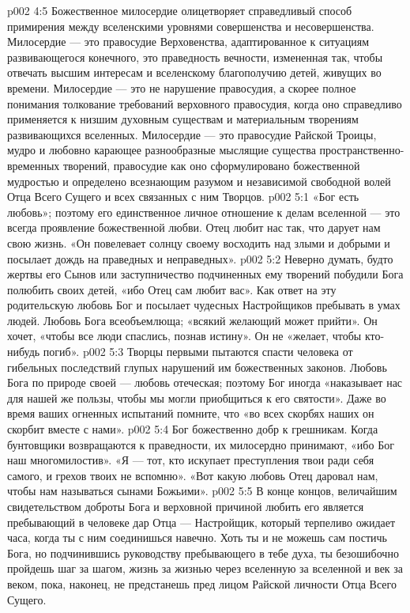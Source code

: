 \vs p002 4:5 Божественное милосердие олицетворяет справедливый способ примирения между вселенскими уровнями совершенства и несовершенства. Милосердие --- это правосудие Верховенства, адаптированное к ситуациям развивающегося конечного, это праведность вечности, измененная так, чтобы отвечать высшим интересам и вселенскому благополучию детей, живущих во времени. Милосердие --- это не нарушение правосудия, а скорее полное понимания толкование требований верховного правосудия, когда оно справедливо применяется к низшим духовным существам и материальным творениям развивающихся вселенных. Милосердие --- это правосудие Райской Троицы, мудро и любовно карающее разнообразные мыслящие существа пространственно\hyp{}временных творений, правосудие как оно сформулировано божественной мудростью и определено всезнающим разумом и независимой свободной волей Отца Всего Сущего и всех связанных с ним Творцов.
\vs p002 5:1 «Бог есть любовь»; поэтому его единственное личное отношение к делам вселенной --- это всегда проявление божественной любви. Отец любит нас так, что дарует нам свою жизнь. «Он повелевает солнцу своему восходить над злыми и добрыми и посылает дождь на праведных и неправедных».
\vs p002 5:2 \pc Неверно думать, будто жертвы его Сынов или заступничество подчиненных ему творений побудили Бога полюбить своих детей, «ибо Отец сам любит вас». Как ответ на эту родительскую любовь Бог и посылает чудесных Настройщиков пребывать в умах людей. Любовь Бога всеобъемлюща; «всякий желающий может прийти». Он хочет, «чтобы все люди спаслись, познав истину». Он не «желает, чтобы кто\hyp{}нибудь погиб».
\vs p002 5:3 Творцы первыми пытаются спасти человека от гибельных последствий глупых нарушений им божественных законов. Любовь Бога по природе своей --- любовь отеческая; поэтому Бог иногда «наказывает нас для нашей же пользы, чтобы мы могли приобщиться к его святости». Даже во время ваших огненных испытаний помните, что «во всех скорбях наших он скорбит вместе с нами».
\vs p002 5:4 Бог божественно добр к грешникам. Когда бунтовщики возвращаются к праведности, их милосердно принимают, «ибо Бог наш многомилостив». «Я --- тот, кто искупает преступления твои ради себя самого, и грехов твоих не вспомню». «Вот какую любовь Отец даровал нам, чтобы нам называться сынами Божьими».
\vs p002 5:5 В конце концов, величайшим свидетельством доброты Бога и верховной причиной любить его является пребывающий в человеке дар Отца --- Настройщик, который терпеливо ожидает часа, когда ты с ним соединишься навечно. Хоть ты и не можешь сам постичь Бога, но подчинившись руководству пребывающего в тебе духа, ты безошибочно пройдешь шаг за шагом, жизнь за жизнью через вселенную за вселенной и век за веком, пока, наконец, не предстанешь пред лицом Райской личности Отца Всего Сущего.
